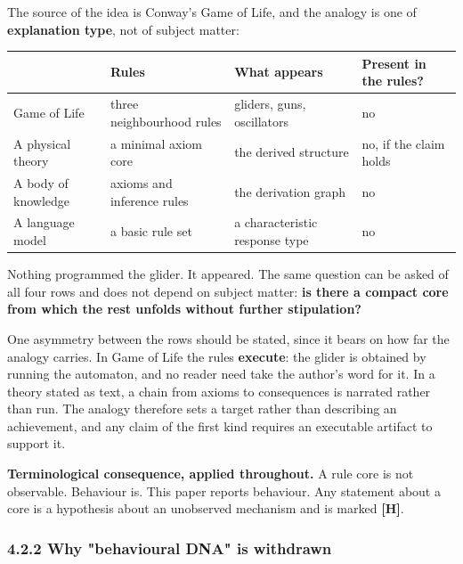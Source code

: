 The source of the idea is Conway's Game of Life, and the analogy is one of \textbf{explanation type}, not of subject matter:

\begin{center}
\small
\begin{tabularx}{\linewidth}{>{\raggedright\arraybackslash}X>{\raggedright\arraybackslash}X>{\raggedright\arraybackslash}X>{\raggedright\arraybackslash}X}
\toprule
 & \textbf{Rules} & \textbf{What appears} & \textbf{Present in the rules?} \\
\midrule
Game of Life & three neighbourhood rules & gliders, guns, oscillators & no \\
A physical theory & a minimal axiom core & the derived structure & no, if the claim holds \\
A body of knowledge & axioms and inference rules & the derivation graph & no \\
A language model & a basic rule set & a characteristic response type & no \\
\bottomrule
\end{tabularx}
\end{center}
Nothing programmed the glider. It appeared. The same question can be asked of all four rows and does not depend on subject matter: \textbf{is there a compact core from which the rest unfolds without further stipulation?}

One asymmetry between the rows should be stated, since it bears on how far the analogy carries. In Game of Life the rules \textbf{execute}: the glider is obtained by running the automaton, and no reader need take the author's word for it. In a theory stated as text, a chain from axioms to consequences is narrated rather than run. The analogy therefore sets a target rather than describing an achievement, and any claim of the first kind requires an executable artifact to support it.

\textbf{Terminological consequence, applied throughout.} A rule core is not observable. Behaviour is. This paper reports behaviour. Any statement about a core is a hypothesis about an unobserved mechanism and is marked \textbf{[H]}.


\subsubsection*{4.2.2 Why "behavioural DNA" is withdrawn}
\label{sec:en:4.2.2}

